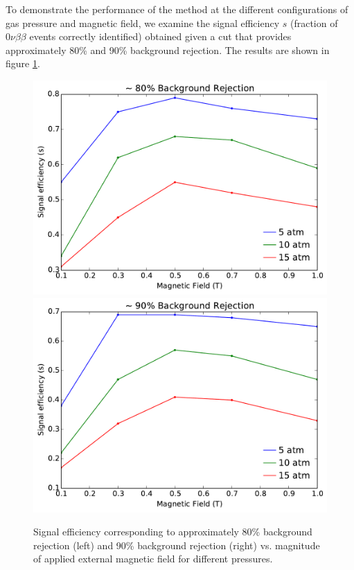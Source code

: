 \documentclass{JINST}
\begin{document}
To demonstrate the performance of the method at the different configurations of gas pressure and magnetic field, we 
examine the signal efficiency $s$ (fraction of $0\nu\beta\beta$ events correctly identified) obtained given a cut that 
provides approximately 80\% and 90\% background rejection.  The results are shown in figure \ref{fig_config}.

\begin{figure}[!htb]
	\centering
	\includegraphics[scale=0.43]{fig/eff_vs_b_80.pdf}
	\includegraphics[scale=0.43]{fig/eff_vs_b_90.pdf}
	\caption{\label{fig_config}Signal efficiency corresponding to approximately 80\% background rejection (left) and 90\% background rejection (right) vs. magnitude of applied external magnetic field for different pressures.}
\end{figure}
\end{document}
